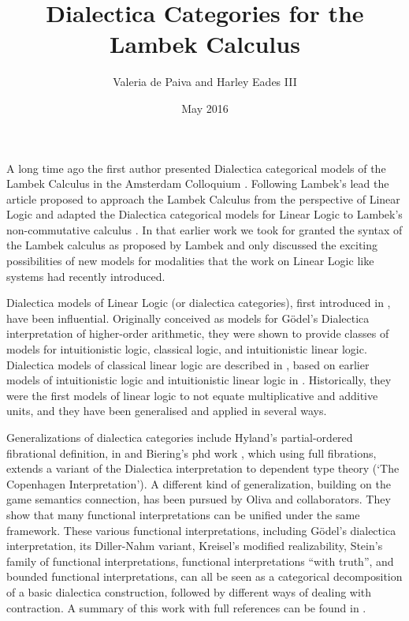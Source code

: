 \documentclass{article}
\title{Dialectica Categories for the Lambek Calculus}
\author{Valeria de Paiva and Harley Eades III}
\date{May 2016}
\begin{document}
\maketitle
A long time ago the first author presented  Dialectica categorical models of the Lambek Calculus in the Amsterdam Colloquium \cite{depaiva1991}. Following Lambek's lead the article proposed to approach the
Lambek Calculus from the perspective of Linear Logic and adapted the Dialectica categorical models for Linear Logic to Lambek's non-commutative calculus \cite{lambek1988}. In that earlier work we took for granted the syntax of the Lambek calculus 
as proposed by Lambek and only discussed the exciting possibilities of new models for modalities that the work on Linear Logic like systems had recently introduced.

Dialectica models of Linear Logic (or dialectica categories), first introduced in \cite{depaiva1989}, have been influential. Originally conceived as models for G\"odel's Dialectica interpretation of higher-order arithmetic, they were shown to provide  classes of models for intuitionistic logic, classical logic, and intuitionistic linear logic. Dialectica models
of classical linear logic are described in \cite{depaiva1990}, based on earlier models of intuitionistic logic
and intuitionistic linear logic in \cite{depaiva1989}. Historically, they were the first models of linear logic to not equate multiplicative and additive units, and they have been generalised and applied in several ways. 

Generalizations of dialectica categories include Hyland's partial-ordered fibrational definition, 
in  \cite{hyland2002} and Biering's phd work \cite{biering2008}, which using full fibrations, extends a variant of the Dialectica interpretation to dependent type theory (`The Copenhagen Interpretation'). A different kind of generalization, building on the game semantics connection, has been pursued by Oliva and collaborators. They show that many functional interpretations can be unified under the same framework. These  various functional interpretations, including G\"odel’s dialectica interpretation, its Diller-Nahm variant, Kreisel's modified realizability, Stein’s family of functional interpretations, functional interpretations “with truth”, and bounded functional interpretations, can all be seen as a categorical decomposition of a basic dialectica construction, followed by different ways of dealing with contraction. A summary of this work with full references can be found in \cite{oliva2014}.
\end{document}
